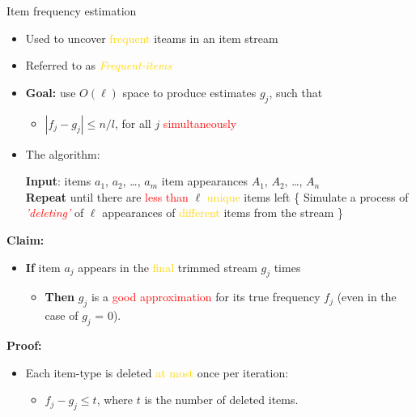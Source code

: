 \documentclass[first=dgreen,second=purple,logo=redque]{aaltoslides}
\newcommand{\IndState}{\State\hspace{\algorithmicindent}}
\begin{document}
\begin{frame}[allowframebreaks=1]{Item frequency estimation}
\begin{itemize}
    \item Used to uncover \textcolor{gold}{frequent} iteams in an item stream 
	\item Referred to as \textcolor{gold}{\textit{Frequent-items}}
	\item \textbf{Goal:} use $O(\ell)$ space to produce estimates $g_{j}$, such
	that
	\begin{itemize}\item{$|f_{j} - g_{j} | \leq n/l$}, for all $j$
	\textcolor{red}{simultaneously}\end{itemize}

\item The algorithm:
  \begin{algorithmic}
    \State \textbf{Input}: \textcolor{dgreen}{items} $a_{1}$, $a_{2}$, \ldots,
    $a_{m}$
    \IndState \textcolor{dgreen}{item appearances} $A_{1}$, $A_{2}$, \ldots,
    $A_{n}$
    \\\State \textbf{Repeat} until there are \textcolor{red}{less than}
    $\ell$ \textcolor{gold}{unique} items left \{
     \IndState Simulate a process of
     \textcolor{red}{\textit{'deleting'}} of $\ell$ appearances of
     \IndState \textcolor{gold}{different} items from the stream
    \State \}
  \end{algorithmic}
\end{itemize}


\framebreak

\textbf{Claim:}

\begin{itemize}
\item \textbf{If} item $a_{j}$ appears in the \textcolor{gold}{final} trimmed
stream $g_{j}$ times
\begin{itemize}
  \item \textbf{Then} $g_{j}$ is a \textcolor{red}{good approximation} for its
  true frequency $f_{j}$ (even in the case of $g_{j}$ = 0).
\end{itemize}         
\end{itemize}

\textbf{Proof:}
\begin{itemize}
   \item Each item-type is deleted \textcolor{gold}{at most} once per iteration:
   \begin{itemize} \item $f_{j} - g_{j} \leq t$, where $t$ is the
   number of deleted items.\end{itemize}
\end{itemize}


\end{frame}
\end{document}
